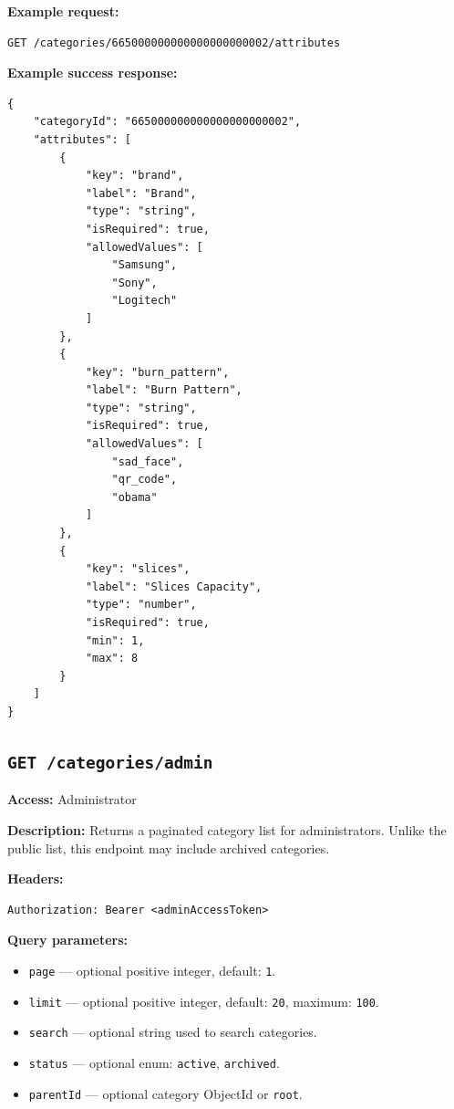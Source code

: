 \textbf{Example request:}

\begin{verbatim}
GET /categories/665000000000000000000002/attributes
\end{verbatim}

\textbf{Example success response:}

\begin{verbatim}
{
    "categoryId": "665000000000000000000002",
    "attributes": [
        {
            "key": "brand",
            "label": "Brand",
            "type": "string",
            "isRequired": true,
            "allowedValues": [
                "Samsung",
                "Sony",
                "Logitech"
            ]
        },
        {
            "key": "burn_pattern",
            "label": "Burn Pattern",
            "type": "string",
            "isRequired": true,
            "allowedValues": [
                "sad_face",
                "qr_code",
                "obama"
            ]
        },
        {
            "key": "slices",
            "label": "Slices Capacity",
            "type": "number",
            "isRequired": true,
            "min": 1,
            "max": 8
        }
    ]
}
\end{verbatim}

\subsection{\texttt{GET /categories/admin}}

\textbf{Access:} Administrator

\textbf{Description:} Returns a paginated category list for administrators. Unlike the public list, this endpoint may include archived categories.

\textbf{Headers:}

\begin{verbatim}
Authorization: Bearer <adminAccessToken>
\end{verbatim}

\textbf{Query parameters:}

\begin{itemize}
    \item \texttt{page} --- optional positive integer, default: \texttt{1}.
    \item \texttt{limit} --- optional positive integer, default: \texttt{20}, maximum: \texttt{100}.
    \item \texttt{search} --- optional string used to search categories.
    \item \texttt{status} --- optional enum: \texttt{active}, \texttt{archived}.
    \item \texttt{parentId} --- optional category ObjectId or \texttt{root}.
\end{itemize}

